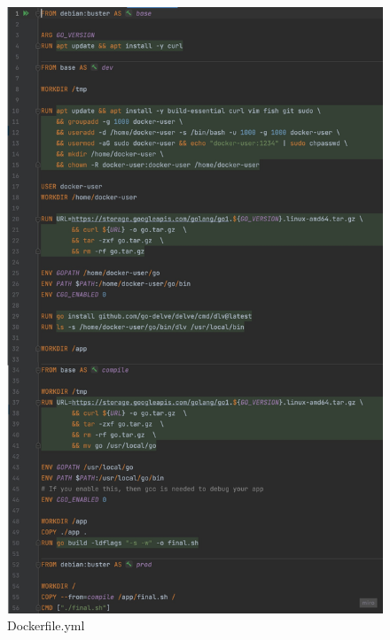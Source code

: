 \begin{figure}[H]
    \centering
    \includegraphics[scale = 0.25]{part/Proyecto_ejecutivo/memoria_constructiva/docker/PFM - Dockerfile}
    \caption{Dockerfile.yml}\label{fig:dockerfile}
\end{figure}